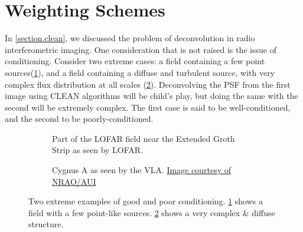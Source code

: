 \section{Weighting Schemes}
\pg
In \cref{section.clean}, we discussed the problem of deconvolution in radio interferometric imaging. One consideration that is not raised is the issue of conditioning. Consider two extreme cases: a field containing a few point sources(\cref{fig.point}), and a field containing a diffuse and turbulent source, with very complex flux distribution at all scales (\cref{fig.cyga}). Deconvolving the PSF from the first image using CLEAN algorithms will be child's play, but doing the same with the second will be extremely complex. The first case is said to be well-conditioned, and the second to be poorly-conditioned.

\begin{figure}[h!]
\centering
\begin{subfigure}{.45\textwidth}
\caption{\label{fig.point} Part of the LOFAR field near the Extended Groth Strip as seen by LOFAR.}
\end{subfigure}
\hfill
\begin{subfigure}{.53\textwidth}
\caption{\label{fig.cyga} Cygnus A as seen by the VLA. \href{http://images.nrao.edu/110}{Image courtesy of NRAO/AUI}}
\end{subfigure}
\caption{\label{fig.conditioning} Two extreme examples of good and poor conditioning. \cref{fig.point} shows a field with a few point-like sources. \cref{fig.cyga} shows a very complex \& diffuse structure.}
\end{figure}


